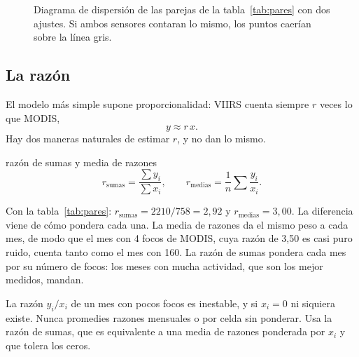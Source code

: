 \begin{figure}[ht]
\centering
{}
\caption{Diagrama de dispersión de las parejas de la tabla~\ref{tab:pares} con dos ajustes. Si
ambos sensores contaran lo mismo, los puntos caerían sobre la línea gris.}
\label{fig:dispersion}
\end{figure}

\subsection{La razón}

El modelo más simple supone proporcionalidad: VIIRS cuenta siempre $r$ veces lo que MODIS,
\begin{equation}
  y \approx r\,x .
\end{equation}
Hay dos maneras naturales de estimar $r$, y no dan lo mismo.

\begin{definicion}{razón de sumas y media de razones}
\[
  r_{\text{sumas}} = \frac{\sum y_i}{\sum x_i},
  \qquad
  r_{\text{medias}} = \frac{1}{n}\sum \frac{y_i}{x_i} .
\]
\end{definicion}

Con la tabla~\ref{tab:pares}: $r_{\text{sumas}} = 2210/758 = 2{,}92$ y $r_{\text{medias}} =
3{,}00$. La diferencia viene de cómo pondera cada una. La media de razones da el mismo peso a
cada mes, de modo que el mes con 4 focos de MODIS, cuya razón de 3,50 es casi puro ruido, cuenta
tanto como el mes con 160. La razón de sumas pondera cada mes por su número de focos: los meses
con mucha actividad, que son los mejor medidos, mandan.

\begin{atencion}
La razón $y_i/x_i$ de un mes con pocos focos es inestable, y si $x_i = 0$ ni siquiera existe.
Nunca promedies razones mensuales o por celda sin ponderar. Usa la razón de sumas, que es
equivalente a una media de razones ponderada por $x_i$ y que tolera los ceros.
\end{atencion}


